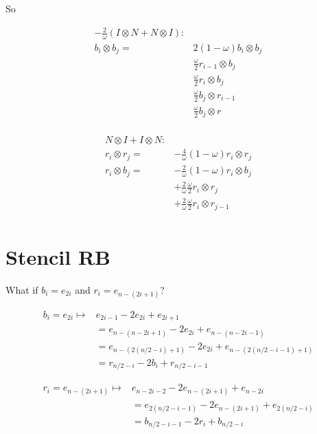 \documentclass{article}
\begin{document}
So

\begin{align*}
    -\frac{2}{\omega} (I \otimes N + N \otimes I): & \\
    b_i \otimes b_j = & 2(1 - \omega)b_i \otimes b_j           \\
                      & \frac{\omega}{2} r_{i - 1} \otimes b_j \\
                      & \frac{\omega}{2} r_i       \otimes b_j \\
                      & \frac{\omega}{2} b_j \otimes r_{i - 1} \\
                      & \frac{\omega}{2} b_j \otimes r         \\
\end{align*}

\begin{align*}
    N \otimes I + I \otimes N: & \\
    r_i \otimes r_j = & -\frac{4}{\omega}(1 - \omega)r_i \otimes r_j \\
    r_i \otimes b_j = & -\frac{2}{\omega}(1 - \omega)r_i \otimes b_j \\
                      & +\frac{2}{\omega}\frac{\omega}{2} r_i \otimes r_j \\
                      & +\frac{2}{\omega}\frac{\omega}{2} r_i \otimes r_{j - 1} \\
\end{align*}

\newpage

\section{Stencil RB}

What if $b_{i} = e_{2i}$ and $r_i = e_{n - (2i + 1)}$?

\begin{align*}
    b_i = e_{2i} \mapsto & e_{2i - 1} -2 e_{2i} + e_{2i + 1} \\
                    & = e_{n - (n - 2i + 1)} -2 e_{2i} + e_{n - (n - 2i - 1)} \\
                    & = e_{n - (2(n/2 - i) + 1)} - 2e_{2i}
                        + e_{n - (2(n/2 - i - 1) + 1)} \\
                    & = r_{n / 2 - i} -2 b_{i} + r_{n / 2 - i - 1}
\end{align*}

\begin{align*}
    r_i = e_{n - (2i + 1)} \mapsto & e_{n - 2i - 2} -2 e_{n - (2i + 1)} + 
                                     e_{n - 2i} \\
                    & = e_{2(n / 2 - i - 1)} -2 e_{n - (2i + 1)} + 
                                     e_{2(n / 2 - i)} \\
                    & = b_{n / 2 - i - 1} -2 r_{i} + b_{n / 2 - i}
\end{align*}
\end{document}
